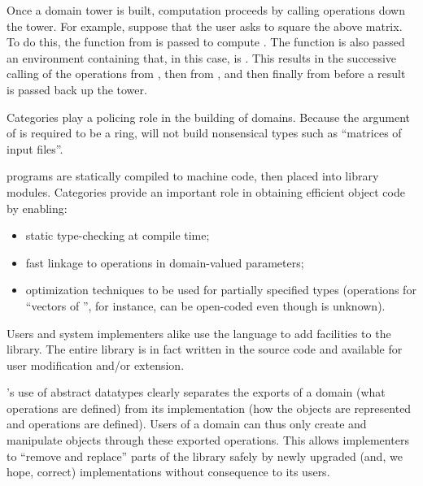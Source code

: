 Once a domain tower is built, computation proceeds by calling operations
down the tower.
For example, suppose that the user asks to square the above matrix.
To do this, the function  from 
is passed  to compute .
The function is also passed
an environment containing  that, in this case, is
.
This results in the successive calling of the 
operations from , then from , and
then finally from  before a result is passed back up
the tower.

Categories play a policing role in the building of domains.
Because the argument of  is required to be
a ring, \Language{} will not build nonsensical types such as
``matrices of input files''.


\par %
\Language{} programs are statically compiled to machine code,
then placed into library modules.
Categories provide an important role in obtaining efficient object code by enabling:
\begin{itemize}
\item static type-checking at compile time;
\item fast linkage to operations in domain-valued parameters;
\item optimization techniques to be used for partially specified types
(operations for ``vectors of '', for instance, can be open-coded even
though  is unknown).
\end{itemize}


\par %
Users and system implementers alike use the \Language{} language
to add facilities to the \Language{} library.
The entire \Language{} library is in fact written in the \Language{}
source code and available for user modification and/or extension.

\Language{}'s use of abstract datatypes clearly separates the exports
of a domain (what operations are defined) from its implementation (how
the objects are represented and operations are defined).
Users of a domain can thus only create and manipulate objects through
these exported  operations.
This allows implementers to ``remove and replace''
parts of the library safely by newly upgraded (and, we hope, correct)
implementations without consequence to its users.

